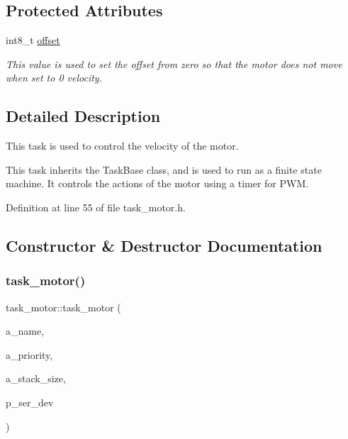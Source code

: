 \subsection*{Protected Attributes}
\begin{DoxyCompactItemize}
\item 
\mbox{\label{classtask__motor_a7ccbea1fe01e35b055688cca8b5be8f0}} 
int8\+\_\+t \mbox{\hyperlink{classtask__motor_a7ccbea1fe01e35b055688cca8b5be8f0}{offset}}
\begin{DoxyCompactList}\small\item\em This value is used to set the offset from zero so that the motor does not move when set to 0 velocity. \end{DoxyCompactList}\end{DoxyCompactItemize}


\subsection{Detailed Description}
This task is used to control the velocity of the motor. 

This task inherits the Task\+Base class, and is used to run as a finite state machine. It controls the actions of the motor using a timer for P\+WM. 

Definition at line 55 of file task\+\_\+motor.\+h.



\subsection{Constructor \& Destructor Documentation}
\mbox{\label{classtask__motor_a6ed0a0b463e698d636b28bcdd518a027}} 
\subsubsection{\texorpdfstring{task\+\_\+motor()}{task\_motor()}}
{\footnotesize\ttfamily task\+\_\+motor\+::task\+\_\+motor (\begin{DoxyParamCaption}\item[{const char $\ast$}]{a\+\_\+name,  }\item[{unsigned port\+B\+A\+S\+E\+\_\+\+T\+Y\+PE}]{a\+\_\+priority,  }\item[{size\+\_\+t}]{a\+\_\+stack\+\_\+size,  }\item[{emstream $\ast$}]{p\+\_\+ser\+\_\+dev }\end{DoxyParamCaption})}

